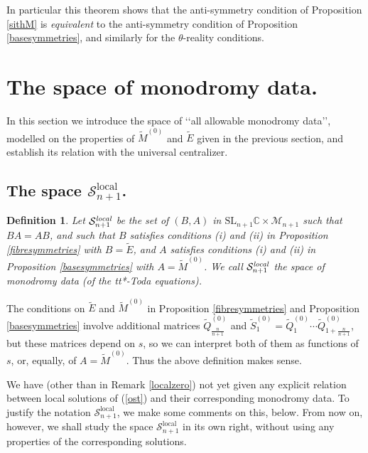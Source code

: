 \documentclass[a4paper,12pt,leqno]{amsart}
\numberwithin{equation}{section}
\theoremstyle{plain}
\newtheorem{definition}[theorem]{Definition}
\theoremstyle{definition}
\newcommand{\C}{\mathbb C}
\renewcommand{\th}{\theta}
\newcommand{\SL}{\textrm{SL}}
\newcommand{\cS}{\mathcal{S}}
\newcommand{\cM}{\mathcal{M}}
\renewcommand{\ll}{\lq\lq}
\newcommand{\rrr}{\rq\rq}
\newcommand{\tSz}{  \tilde S^{(0)}  }
\newcommand{\tQz}{  \tilde Q^{(0)}  }
\newcommand{\tE}{  \tilde E  }
\newcommand{\tMz}{  \tilde M^{(0)}  }
\begin{document}
In particular this theorem shows that the anti-symmetry condition of
Proposition \ref{sithM} is {\em equivalent} to the anti-symmetry condition of
Proposition \ref{basesymmetries}, and similarly for the $\th$-reality conditions.


\section{The space of monodromy data.}\label{data}

In this section we introduce the space of \ll all allowable monodromy data\rrr, modelled on the properties
of $\tMz$ and $\tE$ given in the previous section, and establish its relation with
the universal centralizer.

\subsection{The space $\cS_{n+1}^{\text{local}}$.}\label{locsol}

\begin{definition}\label{thespace}
Let
$
\cS_{n+1}^{\text{\em local}}
$
be the set of
$(B,A)$ in $\SL_{n+1}\C \times
\cM_{n+1}$
such that
$BA=AB$, and
such that
$B$ satisfies conditions (i) and (ii) in Proposition \ref{fibresymmetries}
with $B=\tE$, and
$A$ satisfies conditions (i) and (ii) in Proposition \ref{basesymmetries}
with $A=\tMz$.
We call $\cS_{n+1}^{\text{\em local}}$
the {\em space of  monodromy data} (of the
tt*-Toda equations).
\end{definition}

The conditions on $\tE$ and $\tMz$
in Proposition \ref{fibresymmetries} and Proposition \ref{basesymmetries}
involve additional matrices
$\tQz_{ {\scriptstyle\frac{n}{n+1}}  }$ and
$\tSz_1 = \tQz_1 \cdots \tQz_{1+\scriptstyle\frac n{n+1}}$, but
these matrices depend on $s$, so we can interpret both of them
as functions of $s$, or, equally, of  $A=\tMz$. Thus
the above definition makes sense.

We have (other than in Remark \ref{localzero}) not yet given any explicit relation between
local solutions of (\ref{ost}) and their corresponding monodromy data.
To justify the notation $\cS_{n+1}^{\text{local}}$,
we make some comments on this, below. From now on, however, we shall
study the space $\cS_{n+1}^{\text{local}}$ in its own right, without
using any properties of the corresponding solutions.
\end{document}
